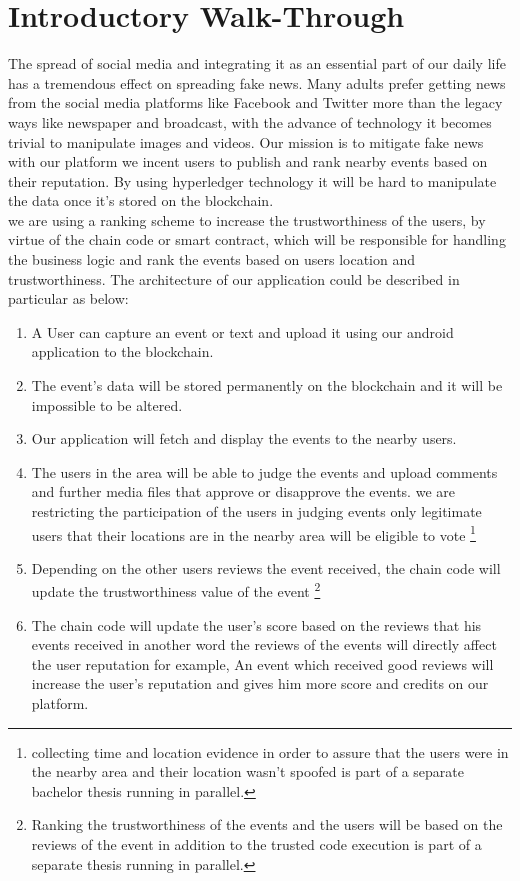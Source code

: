 \cleardoublepage

	\section{Introductory Walk-Through}
    The spread of social media and integrating it as an essential part of our daily life has a tremendous effect on spreading fake news. Many adults prefer getting news from the social media platforms like Facebook and Twitter more than the legacy ways like newspaper and broadcast, with the advance of technology it becomes trivial to manipulate images and videos.   
    Our mission is to mitigate fake news with our platform we incent users to publish and rank nearby events based on their reputation. By using hyperledger technology it will be hard to manipulate the data once it's stored on the blockchain.\\ we are using a ranking scheme to increase the trustworthiness of the users, by virtue of the chain code or smart contract, which will be responsible for handling the business logic and rank the events based on users location and trustworthiness. The architecture of our application could be described in particular as below:      

       \begin{enumerate}
	 \item {A User can capture an event or text and upload it using our android application to the blockchain.}
	 \item {The event's data will be stored permanently on the blockchain and it will be impossible to be altered.} 
	 \item {Our application will fetch and display the events to the nearby users.} 
         \item {The users in the area will be able to judge the events and upload comments and further media files that approve or disapprove the events.  we are restricting the participation of the users in judging events only legitimate users that their locations are in the nearby area will be eligible to vote \footnote[1]{collecting time and location evidence in order to assure that the users were in the nearby area and their location wasn't spoofed  is part of a separate bachelor thesis running in parallel.} }
         \item {Depending on the other users reviews the event received, the chain code will update the trustworthiness value of the event \footnote[2]{Ranking the trustworthiness of the events and the users will be based on the reviews of the event in addition to the trusted code execution is part of a separate thesis running in parallel. } }
          \item {The chain code will update the user's score based on the reviews that his events received in another word the reviews of the events will directly affect the user reputation for example, An event which received good reviews will increase the user's reputation and gives him more score and credits on our platform.} 
	\end{enumerate}


